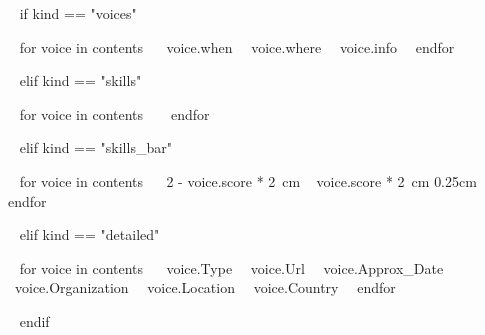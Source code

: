 ~{ if kind == "voices" }~


    ~{ for voice in contents }~
        {~{{voice.when}}~}
        {~{{voice.where}}~}
        {~{{voice.info}}~}~{ endfor }~

~{ elif kind == "skills" }~

    
    ~{ for voice in contents }~
    ~{ endfor }~
        

~{ elif kind == "skills_bar" }~

    
    ~{ for voice in contents }~
    {~{{2 - voice.score * 2}}~cm}
    {~{{    voice.score * 2}}~cm}
    {0.25cm}~{ endfor }~

~{ elif kind == "detailed" }~


    ~{ for voice in contents }~
    {~{{voice.Type}}~}
    {~{{voice.Url}}~}
    {~{{voice.Approx_Date}}~}
    {~{{voice.Organization}}~}
    {~{{voice.Location}}~}
    {~{{voice.Country}}~}~{ endfor }~


~{ endif }~


